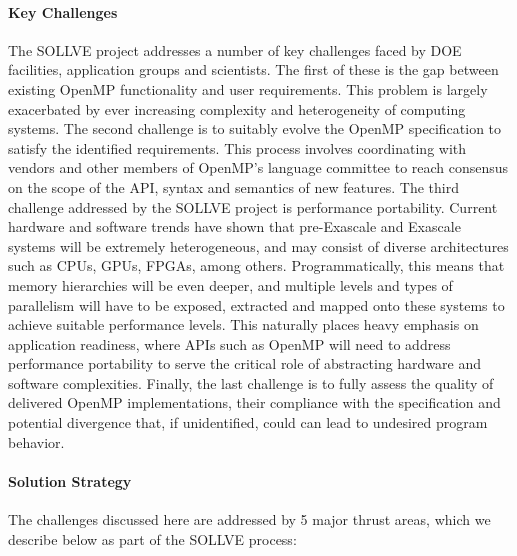 \paragraph{Key  Challenges}
The SOLLVE project addresses a number of key challenges faced by DOE facilities,
application groups and scientists. The first of these is the gap between
existing OpenMP functionality and user requirements. This problem is largely
exacerbated by ever increasing complexity and heterogeneity of computing
systems.
The second challenge is to suitably evolve the OpenMP specification to satisfy
the identified requirements. This process involves coordinating with vendors
and other members of OpenMP's language committee  to reach consensus on the scope of the API, syntax and semantics of new features.
The third challenge addressed by the SOLLVE project is performance portability.
Current hardware and software trends 
\cite{exascale-roadmap.ijhpca.2011}
 have shown that
pre-Exascale and Exascale systems will be extremely heterogeneous, and may 
consist of  diverse architectures such as
CPUs, GPUs, FPGAs, among others. Programmatically, this means that 
memory hierarchies will be even deeper, and multiple levels and types
of parallelism will have to be exposed, extracted and mapped onto these systems 
to achieve suitable performance levels. 
This naturally places heavy emphasis on application readiness, where APIs such as 
OpenMP will need to address 
performance portability to serve the critical role
of abstracting hardware and software complexities.
Finally, the last challenge is to fully assess the quality of delivered
OpenMP implementations, their compliance with the specification and potential
divergence that, if unidentified, could can lead to undesired program behavior.


\paragraph{Solution Strategy}
The challenges discussed here are addressed by 5 major thrust areas, which
we describe below as part of the SOLLVE process:

